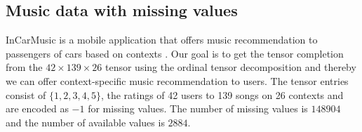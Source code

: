 \documentclass{article}
\theoremstyle{plain}
\theoremstyle{definition}
\begin{document}
\subsection{Music data with missing values}

InCarMusic is a mobile application that offers music recommendation to passengers of cars based on contexts \citep{Baltrunas2011InCarMusicCM}.
Our goal is to get the tensor completion from the $42\times139\times 26$ tensor using the ordinal tensor decomposition and thereby we can offer context-specific music recommendation to users.
The tensor entries consist of $\{1,2,3,4,5\}$, the ratings of 42 users to 139 songs on 26 contexts and are encoded as $-1$ for missing values. The number of missing values is $148904$ and the number of available values is $2884$.



\end{document}
